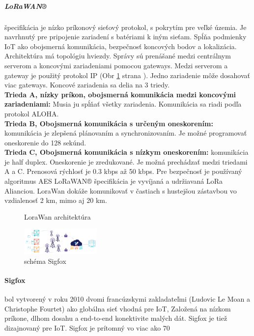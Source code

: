 \documentclass[../../main.tex]{subfiles}
\begin{document}
\subparagraph{LoRaWAN®} špecifikácia je nízko príkonový sieťový protokol, s pokrytím pre veľké územia. Je navrhnutý pre pripojenie zariadení s batériami k iným sieťam. Spĺňa podmienky IoT ako obojsmerná komunikácia, bezpečnosť koncových bodov a lokalizácia. Architektúra má topológiu hviezdy. Správy sú prenášané medzi centrálnym serverom a koncovými zariadeniami pomocou gateways. Medzi serverom a gateway je použitý protokol IP (Obr \ref{fig:lorawan} strana \pageref{fig:lorawan}). Jedno zariadenie môže dosahovať viac gateways. Koncové zariadenia sa delia na 3 triedy.\\
    \textbf{Trieda A, nízky príkon, obojsmerná komunikácia medzi koncovými zariadeniami:} Musia ju spĺňať všetky zariadenia. Komunikácia sa riadi podľa protokol ALOHA.\\
    \textbf{Trieda B, Obojsmerná komunikácia s určeným oneskorením:} komunikácia je zlepšená plánovaním a synchronizovaním. Je možné programovať oneskorenie do 128 sekúnd.\\
    \textbf{Trieda C, Obojsmerná komunikácia s nízkym oneskorením:} komunikácia je half duplex. Oneskorenie je zredukované. Je možná prechádzať medzi triedami A a C.
 Prenosová rýchlosť je 0.3 kbps až 50 kbps. Pre bezpečnosť je používaný algoritmus AES LoRaWAN®    špecifikácia je vyvíjaná a udržiavaná  LoRa Alianciou.\cite{lorawan}
 LoraWan dokáže komunikovať v častiach s hustejšou zástavbou vo vzdialenosť 2 km, mimo aj 20 km.\cite{WOLF201923}
 \begin{figure}[h!]
  
  \caption{LoraWan architektúra\cite{lorawan}}
    \label{fig:lorawan}
\end{figure} 

\newpage
 \begin{figure}
 \centering
  \includegraphics[width=0.35\textwidth]{images/sigfox.png}
  \caption{schéma Sigfox\cite{sigfox}}
    \label{fig:sigofx}
\end{figure}
\paragraph{Sigfox} bol vytvorený v roku 2010 dvomi francúzskymi zakladateľmi (Ludovic Le Moan a Christophe Fourtet) ako globálna sieť vhodná pre IoT, Založená na nízkom príkone, dlhom dosahu a end-to-end konektivite malých dát. Sigfox je tiež dizajnovaný pre IoT. Sigfox je prítomný vo viac ako 70 
\end{document}
